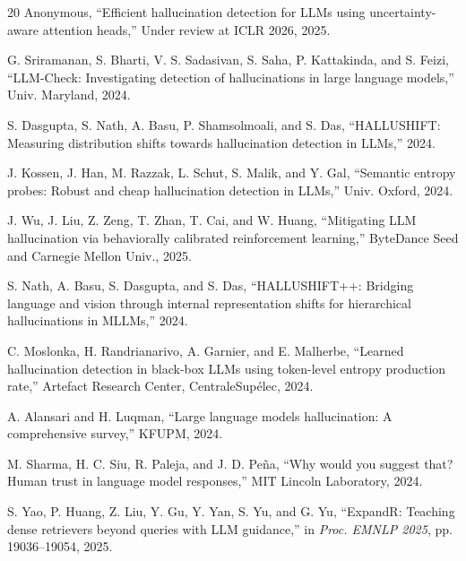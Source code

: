 \documentclass{article}
\begin{document}
\begin{thebibliography}{20}
Anonymous,
``Efficient hallucination detection for LLMs using uncertainty-aware attention heads,''
Under review at ICLR 2026, 2025.

G. Sriramanan, S. Bharti, V. S. Sadasivan, S. Saha, P. Kattakinda, and S. Feizi,
``LLM-Check: Investigating detection of hallucinations in large language models,''
Univ. Maryland, 2024.

S. Dasgupta, S. Nath, A. Basu, P. Shamsolmoali, and S. Das,
``HALLUSHIFT: Measuring distribution shifts towards hallucination detection in LLMs,'' 2024.

J. Kossen, J. Han, M. Razzak, L. Schut, S. Malik, and Y. Gal,
``Semantic entropy probes: Robust and cheap hallucination detection in LLMs,''
Univ. Oxford, 2024.

J. Wu, J. Liu, Z. Zeng, T. Zhan, T. Cai, and W. Huang,
``Mitigating LLM hallucination via behaviorally calibrated reinforcement learning,''
ByteDance Seed and Carnegie Mellon Univ., 2025.

S. Nath, A. Basu, S. Dasgupta, and S. Das,
``HALLUSHIFT++: Bridging language and vision through internal representation shifts for hierarchical hallucinations in MLLMs,'' 2024.

C. Moslonka, H. Randrianarivo, A. Garnier, and E. Malherbe,
``Learned hallucination detection in black-box LLMs using token-level entropy production rate,''
Artefact Research Center, CentraleSup\'{e}lec, 2024.

A. Alansari and H. Luqman,
``Large language models hallucination: A comprehensive survey,''
KFUPM, 2024.

M. Sharma, H. C. Siu, R. Paleja, and J. D. Pe\~{n}a,
``Why would you suggest that? Human trust in language model responses,''
MIT Lincoln Laboratory, 2024.

S. Yao, P. Huang, Z. Liu, Y. Gu, Y. Yan, S. Yu, and G. Yu,
``ExpandR: Teaching dense retrievers beyond queries with LLM guidance,''
in \textit{Proc. EMNLP 2025}, pp. 19036--19054, 2025.

\end{thebibliography}
\end{document}
